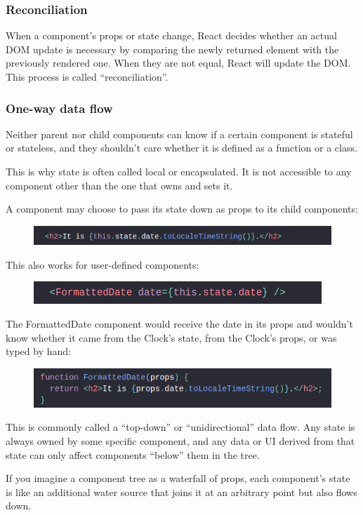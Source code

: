 \subsubsection{Reconciliation}
\par{
	When a component’s props or state change, React decides whether an actual DOM update is necessary by comparing the newly returned element with the previously rendered one. When they are not equal, React will update the DOM. This process is called “reconciliation”.
}
\subsubsection{One-way data flow}
\par{
	Neither parent nor child components can know if a certain component is stateful or stateless, and they shouldn’t care whether it is defined as a function or a class.

	This is why state is often called local or encapsulated. It is not accessible to any component other than the one that owns and sets it.

	A component may choose to pass its state down as props to its child components:

	\begin{figure}[!ht]
		\centering
		\includegraphics[scale=0.7]{Picture/mobile/data_flow_1.png}
		\label{fig:data_flow_1}
	\end{figure}

	This also works for user-defined components:

	\begin{figure}[!ht]
		\centering
		\includegraphics[scale=0.7]{Picture/mobile/data_flow_2.png}
		\label{fig:data_flow_2}
	\end{figure}

	The FormattedDate component would receive the date in its props and wouldn’t know whether it came from the Clock’s state, from the Clock’s props, or was typed by hand:

	\begin{figure}[!ht]
		\centering
		\includegraphics[scale=0.7]{Picture/mobile/data_flow_3.png}
		\label{fig:data_flow_2}
	\end{figure}

	This is commonly called a “top-down” or “unidirectional” data flow. Any state is always owned by some specific component, and any data or UI derived from that state can only affect components “below” them in the tree.

	If you imagine a component tree as a waterfall of props, each component’s state is like an additional water source that joins it at an arbitrary point but also flows down.


}
